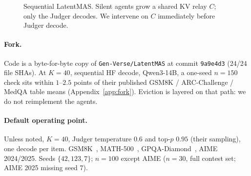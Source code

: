 \documentclass[11pt]{article}
\begin{document}
\begin{figure}[t]
\centering
{}
\caption{Sequential LatentMAS. Silent agents grow a shared KV relay $C$;
only the Judger decodes. We intervene on $C$ immediately before Judger
decode.}
\label{fig:pipe}
\end{figure}

\paragraph{Fork.}
Code is a byte-for-byte copy of
\texttt{Gen-Verse/LatentMAS} at commit \texttt{9a9e4d3} (24/24 file SHAs).
At $K{=}40$, sequential HF decode, Qwen3-14B, a one-seed $n{=}150$ check
sits within $1$--$2.5$ points of their published GSM8K / ARC-Challenge /
MedQA table means (Appendix~\ref{app:fork}). Eviction is layered on that
path: we do not reimplement the agents.

\paragraph{Default operating point.}
Unless noted, $K{=}40$, Judger temperature $0.6$ and top-$p$ $0.95$
(their sampling), one decode per item. GSM8K~\citep{cobbe2021gsm8k},
MATH-500~\citep{hendrycks2021math,lightman2023math500},
GPQA-Diamond~\citep{rein2023gpqa}, AIME 2024/2025.
Seeds $\{42,123,7\}$; $n{=}100$ except AIME ($n{=}30$, full contest set;
AIME 2025 missing seed 7).
\end{document}
